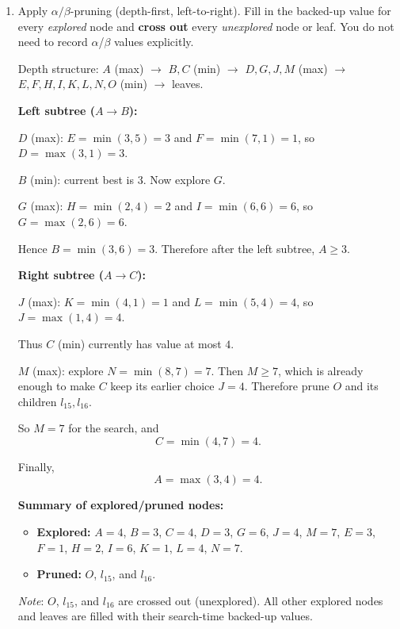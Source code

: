 \noindent
\begin{enumerate}
    \item \points[8] Apply $\alpha/\beta$-pruning (depth-first, left-to-right).
Fill in the backed-up value for every \emph{explored} node and
\textbf{cross out} every \emph{unexplored} node or leaf.
You do not need to record $\alpha$/$\beta$ values explicitly.
\begin{solution}
Depth structure: $A$ (max) $\to$ $B,C$ (min) $\to$ $D,G,J,M$ (max) $\to$ $E,F,H,I,K,L,N,O$ (min) $\to$ leaves.

\medskip
\noindent \textbf{Left subtree ($A \to B$):}

\smallskip
$D$ (max): $E=\min(3,5)=3$ and $F=\min(7,1)=1$, so $D=\max(3,1)=3$.

$B$ (min): current best is $3$. Now explore $G$.

$G$ (max): $H=\min(2,4)=2$ and $I=\min(6,6)=6$, so $G=\max(2,6)=6$.

Hence $B=\min(3,6)=3$. Therefore after the left subtree, $A \ge 3$.

\medskip
\noindent \textbf{Right subtree ($A \to C$):}

\smallskip
$J$ (max): $K=\min(4,1)=1$ and $L=\min(5,4)=4$, so $J=\max(1,4)=4$.

Thus $C$ (min) currently has value at most $4$.

$M$ (max): explore $N=\min(8,7)=7$. Then $M \ge 7$, which is already enough to make $C$ keep its earlier choice $J=4$. Therefore prune $O$ and its children $l_{15}, l_{16}$.

So $M=7$ for the search, and
\[
C=\min(4,7)=4.
\]

Finally,
\[
A=\max(3,4)=4.
\]

\medskip
\noindent \textbf{Summary of explored/pruned nodes:}
\begin{itemize}
  \item \textbf{Explored:} $A=4$, $B=3$, $C=4$, $D=3$, $G=6$, $J=4$, $M=7$, $E=3$, $F=1$, $H=2$, $I=6$, $K=1$, $L=4$, $N=7$.
  \item \textbf{Pruned:} $O$, $l_{15}$, and $l_{16}$.
\end{itemize}

\medskip
\noindent \textit{Note}: $O$, $l_{15}$, and $l_{16}$ are crossed out (unexplored). All other explored nodes and leaves are filled with their search-time backed-up values.
\end{solution}
\end{enumerate}



